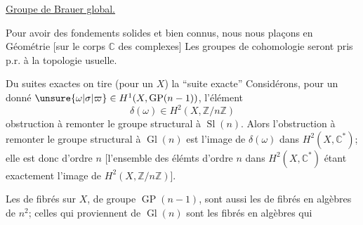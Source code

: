 \uline{Groupe de Brauer global.}

Pour avoir des fondements solides et bien connus, nous nous plaçons en Géométrie   [sur le corps $\mathbb{C}$ des complexes] Les groupes de cohomologie seront pris p.r. à la topologie usuelle.

Du   suites exactes
on tire (pour un  $X$) la ``suite exacte''
Considérons, pour un  donné $\unsure{\omega|\sigma|\varpi}\in H^1(X,\operatorname{GP}(n-1))$, l'élément
\[
\delta(\omega)\in H^2(X,\mathbb{Z}/n\mathbb{Z})
\]
obstruction à remonter le groupe structural à $\operatorname{Sl}(n)$. Alors l'obstruction à remonter le groupe structural à $\operatorname{Gl}(n)$ est l'image de $\delta(\omega)$ dans $H^2(X,\mathbb{C}^*)$; elle est donc d'ordre $n$ [l'ensemble des élémts d'ordre $n$ dans $H^2(X,\mathbb{C}^*)$ étant exactement l'image de $H^2(X,\mathbb{Z}/n\mathbb{Z})$].

Les  de fibrés sur $X$, de groupe $\operatorname{GP}(n-1)$, sont aussi les  de fibrés en algèbres  de   $n^2$; celles qui proviennent de $\operatorname{Gl}(n)$ sont les fibrés en algèbres qui
